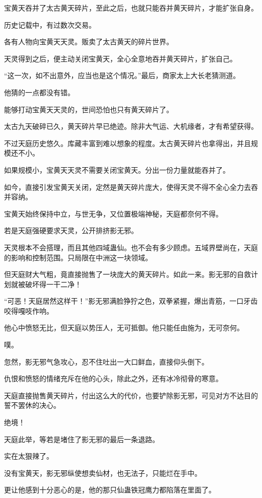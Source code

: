 \begin{this_body}
宝黄天吞并了太古黄天碎片，至此之后，也就只能吞并黄天碎片，才能扩张自身。

历史记载中，有过数次交易。

各有人物向宝黄天天灵。贩卖了太古黄天的碎片世界。

天灵得到之后，便主动关闭宝黄天，全心全意地吞并黄天碎片，扩张自己。

“这一次，如不出意外，应当也是这个情况。”最后，商家太上大长老猜测道。

他猜的一点都没有错。

能够打动宝黄天天灵的，世间恐怕也只有黄天碎片了。

太古九天破碎已久，黄天碎片早已绝迹。除非大气运、大机缘者，才有希望获得。

不过天庭历史悠久。库藏丰富到难以想象的程度。太古黄天碎片也拿得出，并且规模还不小。

如果规模小，宝黄天天灵不需要关闭宝黄天。分出一份力量就能吞并了。

如今，直接引发宝黄天关闭，定然是黄天碎片庞大，使得天灵不得不全心全力去吞并容纳。

宝黄天始终保持中立，与世无争，又位置极端神秘，天庭都奈何不得。

若是天庭强硬要求天灵，公开排挤影无邪。

天灵根本不会搭理，而且其他四域蛊仙。也不会有多少顾虑。五域界壁尚在，天庭的影响和控制范围。只局限在中洲这一块领域。

但天庭财大气粗，竟直接抛售了一块庞大的黄天碎片。如此一来。影无邪的自救计划就被破坏得一干二净！

“可恶！天庭居然这样干！”影无邪满脸狰狞之色，双拳紧握，爆出青筋，一口牙齿咬得嘎吱作响。

他心中愤怒无比，但天庭以势压人，无可抵御。他只能任由施为，无可奈何。

噗。

忽然，影无邪气急攻心，忍不住吐出一大口鲜血，直接仰头倒下。

仇恨和愤怒的情绪充斥在他的心头，除此之外，还有冰冷彻骨的寒意。

天庭直接抛售黄天碎片，付出这么大的代价，也要铲除影无邪，可见对方不达目的誓不罢休的决心。

绝境！

天庭此举，等若是堵住了影无邪的最后一条退路。

实在太狠辣了。

没有宝黄天，影无邪纵使想卖仙材，也无法子，只能烂在手中。

更让他感到十分恶心的是，他的那只仙蛊铁冠鹰力都陷落在里面了。


\end{this_body}
